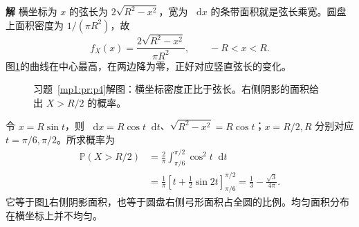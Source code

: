 \documentclass[11pt,openany,fontset=fandol]{ctexbook}
\theoremstyle{definition}\newtheorem{example}{例}[chapter]\newtheorem{exercise}{习题}[chapter]
\newcommand{\SolutionStart}{\par\medskip\ifdim\pagetotal>0pt\ifdim\dimexpr\pagegoal-\pagetotal\relax<3\baselineskip\newpage\fi\fi\noindent\textbf{解}\quad\ignorespaces}
\newenvironment{solution}{\SolutionStart}{\par\medskip}
\newcommand{\dd}{\mathop{}\!\mathrm d}\newcommand{\ee}{\mathrm e}\newcommand{\vct}[1]{\bm{#1}}
\newcommand{\Prob}{\mathbb P}\newcommand{\avg}[1]{\left\langle#1\right\rangle}
\begin{document}
\begin{solution}
横坐标为 $x$ 的弦长为 $2\sqrt{R^2-x^2}$，宽为 $\dd x$ 的条带面积就是弦长乘宽。圆盘上面积密度为 $1/(\pi R^2)$，故
\[
f_X(x)=\frac{2\sqrt{R^2-x^2}}{\pi R^2},\qquad -R<x<R.
\]
图\ref{mp1:fig:p4-s}的曲线在中心最高，在两边降为零，正好对应竖直弦长的变化。

\begin{figure}[H]\centering

\caption{习题~\ref{mp1:pr:p4}解图：横坐标密度正比于弦长。右侧阴影的面积给出 $X>R/2$ 的概率。}\label{mp1:fig:p4-s}
\end{figure}

令 $x=R\sin t$，则 $\dd x=R\cos t\dd t$、$\sqrt{R^2-x^2}=R\cos t$；$x=R/2,R$ 分别对应 $t=\pi/6,\pi/2$。所求概率为
\begin{align*}
\Prob(X>R/2)&=\frac2\pi\int_{\pi/6}^{\pi/2}\cos^2t\dd t\\
&=\frac1\pi\left[t+\frac12\sin2t\right]_{\pi/6}^{\pi/2}
=\frac13-\frac{\sqrt3}{4\pi}.
\end{align*}
它等于图\ref{mp1:fig:p4-s}右侧阴影面积，也等于圆盘右侧弓形面积占全圆的比例。均匀面积分布在横坐标上并不均匀。
\end{solution}
\end{document}
